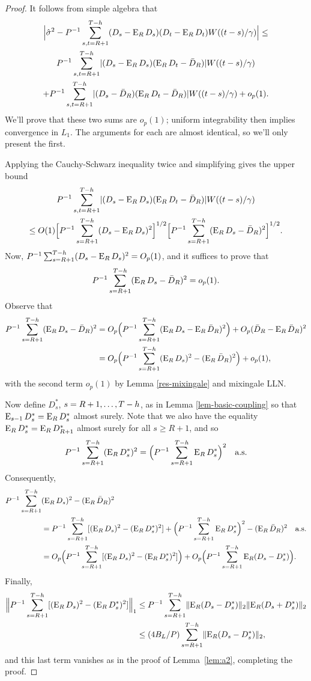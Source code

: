 \documentclass[12pt,draft]{article}
\begin{document}
\begin{proof}
   It follows from simple algebra that
\begin{multline*}
  \Big| \hat{\sigma}^2 -  P^{-1} \sum_{s,t=R+1}^{T-h} (D_s - \operatorname{E}_R
    D_s) (D_t - \operatorname{E}_R D_t) W((t-s)/\gamma) \Big| \leq\\
  P^{-1} \sum_{s,t=R+1}^{T-h} \lvert (D_s - \operatorname{E}_R D_s)(\operatorname{E}_R D_t - \bar{D}_{R}) \rvert W((t-s)/\gamma) \\ + P^{-1} \sum_{s,t=R+1}^{T-h} \lvert (D_s -
  \bar{D}_{R})(\operatorname{E}_R D_t - \bar{D}_{R}) \rvert W((t-s)/\gamma) + o_p(1).
\end{multline*}
We'll prove that these two sums are $o_p(1)$; uniform integrability
then implies convergence in $L_1$.  The arguments for each are almost
identical, so we'll only present the first.

Applying the Cauchy-Schwarz inequality twice and simplifying gives the
upper bound
\begin{multline*}
P^{-1} \sum_{s,t=R+1}^{T-h} \lvert (D_s - \operatorname{E}_R D_s)(\operatorname{E}_R D_t - \bar{D}_{R}) \rvert W((t-s)/\gamma) \\ \leq O(1) \Big[P^{-1} \sum_{s=R+1}^{T-h} (D_s - \operatorname{E}_R D_s)^2\Big]^{1/2} \Big[P^{-1} \sum_{s=R+1}^{T-h}(\operatorname{E}_R D_s - \bar{D}_{R} )^2\Big]^{1/2}.
\end{multline*}
Now,
$P^{-1} \sum_{s=R+1}^{T-h}(D_s - \operatorname{E}_R D_s)^2 = O_p(1)$, and it suffices to prove
that \[P^{-1} \sum_{s=R+1}^{T-h}(\operatorname{E}_R D_s - \bar{D}_{R} )^2 = o_p(1).\]  Observe that
\begin{align*}
  P^{-1} \sum_{s=R+1}^{T-h}(\operatorname{E}_R D_s - \bar{D}_{R} )^2 & = O_p\Big(P^{-1} \sum_{s=R+1}^{T-h}(\operatorname{E}_{R}D_s -
  \operatorname{E}_R\bar{D}_{R})^2\Big) + O_p(\bar{D}_{R} - \operatorname{E}_R\bar{D}_{R})^{2} \\
  &= O_p\Big(P^{-1} \sum_{s=R+1}^{T-h} (\operatorname{E}_RD_s)^2 - (\operatorname{E}_R\bar{D}_{R})^2\Big) +
  o_p(1),
\end{align*}
with the second term $o_p(1)$ by Lemma \ref{res-mixingale} and
 mixingale LLN.

Now define $D_s^*$, $s = R+1,\dots,T-h$, as in Lemma
\ref{lem-basic-coupling} so that $\operatorname{E}_{s-1} D_s^* = \operatorname{E}_R D_s^*$ almost
surely.  Note that we also have the equality $\operatorname{E}_R D_s^* = \operatorname{E}_R
D_{R+1}^*$ almost surely for all $s\geq R+1$, and so
\[
P^{-1} \sum_{s=R+1}^{T-h} (\operatorname{E}_R D_s^*)^2 = \Big(P^{-1} \sum_{s=R+1}^{T-h} \operatorname{E}_R
D_s^*\Big)^2 \quad \text{a.s.}
\]
Consequently,
\begin{align*}
P^{-1} \sum_{s=R+1}^{T-h}& (\operatorname{E}_R D_s)^2 - (\operatorname{E}_R\bar{D}_{R})^2 \\
&= P^{-1} \sum_{s=R+1}^{T-h} [(\operatorname{E}_R D_s)^2 - (\operatorname{E}_R D_s^*)^2]
 + \Big(P^{-1} \sum_{s=R+1}^{T-h} \operatorname{E}_R D_s^*\Big)^2 - (\operatorname{E}_R\bar{D}_{R})^2 \quad \text{a.s}.\\
&= O_p\Big(P^{-1} \sum_{s=R+1}^{T-h} [(\operatorname{E}_R D_s)^2 - (\operatorname{E}_R D_s^*)^2]\Big)
 + O_p\Big(P^{-1} \sum_{s=R+1}^{T-h} \operatorname{E}_R (D_s - D_s^*)\Big).
\end{align*}
Finally,
\begin{align*}
\Big\lVert P^{-1} \sum_{s=R+1}^{T-h} [(\operatorname{E}_RD_s)^2 - (\operatorname{E}_R D_s^*)^2] \Big\rVert_1
&\leq P^{-1} \sum_{s=R+1}^{T-h} \lVert \operatorname{E}_R (D_s - D_s^*) \rVert_2 \lVert
\operatorname{E}_R (D_s + D_s^*) \rVert_2
\\ &\leq (4 B_L/P) \sum_{s=R+1}^{T-h} \lVert \operatorname{E}_R (D_s - D_s^*) \rVert_2,
\end{align*}
and this last term vanishes as in the proof of Lemma~\ref{lem:a2},
completing the proof.
\end{proof}
\end{document}
